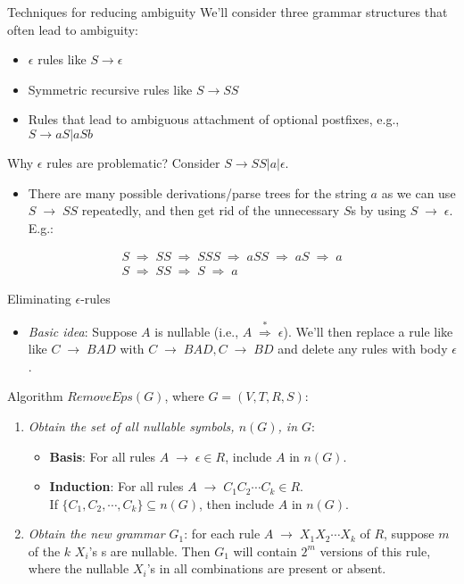 \documentclass{prosper}%
\newcommand{\e} {{\mbox{$\epsilon$}}}
\newcommand{\ra}{\mbox{$\;\rightarrow\;$}}
\newcommand{\dra}{\mbox{$\;\Rightarrow\;$}}
\newcommand{\cdra}{\mbox{$\;\stackrel{*}{\Rightarrow}\;$}}
\begin{document}
\begin{slide}{Techniques for reducing ambiguity}
We'll consider three grammar structures that often lead to ambiguity:
\begin{itemize}
\item $\epsilon$ rules like $S\rightarrow \epsilon$
\item Symmetric recursive rules like $S\rightarrow SS$
\item Rules that lead to ambiguous attachment of optional postfixes, e.g., $S\rightarrow aS | aSb$
\end{itemize}
Why $\epsilon$ rules are problematic? Consider $S\rightarrow SS | a|\epsilon$. 
\begin{itemize}
\item There are many possible derivations/parse trees for the string $a$ as we can use $S\ra SS$ repeatedly, and then get rid of the unnecessary $S$s by using $S\ra \epsilon$. E.g.:
\end{itemize}
\[
\begin{array}{l}
S\dra SS\dra SSS \dra aSS\dra aS \dra a\\
S\dra SS\dra S\dra a
\end{array}
\]
\end{slide}

\begin{slide}{Eliminating \e-rules}
\begin{itemize}
\item {\em  Basic idea}: Suppose $A$ is {\blue nullable} (i.e., $A \cdra \e$). We'll then replace a rule like
like \(
C \ra BAD
\)
with
\(
 C\ra BAD, C\ra BD
\)
 and delete any rules with body \e.
 \end{itemize}
 Algorithm {$RemoveEps(G)$}, where $G=(V,T, R, S)$:
 \begin{enumerate}
 \item {\em Obtain the set of all nullable symbols, $n(G)$,  in $G$}:
 \begin{itemize}
 \item {\bf Basis}: For all rules $A\ra \e\in R$, include $A$ in $n(G)$. 
 \item {\bf Induction}: For all rules $A	\ra C_1C_2\cdots C_k \in R$.\\ If $\{C_1,C_2,\cdots, C_k\}	\subseteq	n(G)$, then include $A$ in $n(G)$.
 \end{itemize}
 \item {\em Obtain the new grammar $G_1$}:  for each rule $A\ra X_1X_2\cdots X_k$ of $R$, suppose $m$ of the $k$ $X_i$'s s are nullable. Then $G_1$ will contain $2^m$ versions of this rule, where the nullable $X_i$'s in all combinations are present or absent.
\end{enumerate}
\end{slide}
\end{document}
